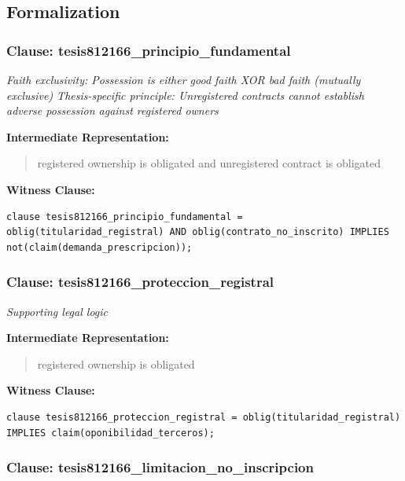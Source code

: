 \documentclass[11pt,a4paper]{article}
\begin{document}
\subsection{Formalization}

\subsubsection{Clause: tesis812166\_principio\_fundamental}

\textit{Faith exclusivity: Possession is either good faith XOR bad faith (mutually exclusive) Thesis-specific principle: Unregistered contracts cannot establish adverse possession against registered owners}

\textbf{Intermediate Representation:}

\begin{quote}
registered ownership is obligated and unregistered contract is obligated
\end{quote}

\textbf{Witness Clause:}

\begin{lstlisting}[style=witnessstyle, language=Witness]
clause tesis812166_principio_fundamental = oblig(titularidad_registral) AND oblig(contrato_no_inscrito) IMPLIES not(claim(demanda_prescripcion));
\end{lstlisting}

\subsubsection{Clause: tesis812166\_proteccion\_registral}

\textit{Supporting legal logic}

\textbf{Intermediate Representation:}

\begin{quote}
registered ownership is obligated
\end{quote}

\textbf{Witness Clause:}

\begin{lstlisting}[style=witnessstyle, language=Witness]
clause tesis812166_proteccion_registral = oblig(titularidad_registral) IMPLIES claim(oponibilidad_terceros);
\end{lstlisting}

\subsubsection{Clause: tesis812166\_limitacion\_no\_inscripcion}
\end{document}
